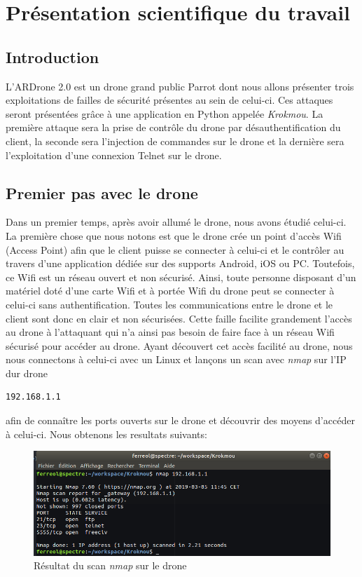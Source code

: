 \section{Présentation scientifique du travail}
\subsection{Introduction}
L'ARDrone 2.0 est un drone grand public Parrot dont nous allons présenter trois exploitations de failles de sécurité présentes au sein de celui-ci. Ces attaques seront présentées grâce à une application en Python appelée \textit{Krokmou}. La première attaque sera la prise de contrôle du drone par désauthentification du client, la seconde sera l'injection de commandes sur le drone et la dernière sera l'exploitation d'une connexion Telnet sur le drone.

\subsection{Premier pas avec le drone}
Dans un premier temps, après avoir allumé le drone, nous avons étudié celui-ci. La première chose que nous notons est que le drone crée un point d'accès Wifi (Access Point) afin que le client puisse se connecter à celui-ci et le contrôler au travers d'une application dédiée sur des supports Android, iOS ou PC. Toutefois, ce Wifi est un réseau ouvert et non sécurisé. Ainsi, toute personne disposant d'un matériel doté d'une carte Wifi et à portée Wifi du drone peut se connecter à celui-ci sans authentification. Toutes les communications entre le drone et le client sont donc en clair et non sécurisées. Cette faille facilite grandement l'accès au drone à l'attaquant qui n'a ainsi pas besoin de faire face à un réseau Wifi sécurisé pour accéder au drone. Ayant découvert cet accès facilité au drone, nous nous connectons à celui-ci avec un Linux et lançons un scan avec \textit{nmap} sur l'IP dur drone \begin{verbatim}192.168.1.1\end{verbatim} afin de connaître les ports ouverts sur le drone et découvrir des moyens d'accéder à celui-ci. Nous obtenons les resultats suivants:

\begin{figure}[H]
  \centering
  \includegraphics[scale=0.3]{images/scan_drone}
  \caption{Résultat du scan \textit{nmap} sur le drone}
\end{figure}

